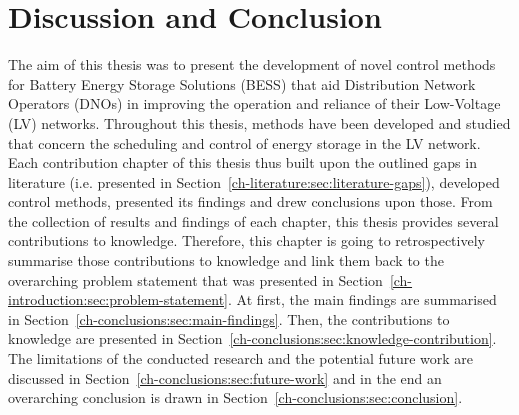 \chapter{Discussion and Conclusion}
\label{ch-conclusions}

The aim of this thesis was to present the development of novel control methods for Battery Energy Storage Solutions (BESS) that aid Distribution Network Operators (DNOs) in improving the operation and reliance of their Low-Voltage (LV) networks.
Throughout this thesis, methods have been developed and studied that concern the scheduling and control of energy storage in the LV network.
Each contribution chapter of this thesis thus built upon the outlined gaps in literature (i.e. presented in Section~\ref{ch-literature:sec:literature-gaps}), developed control methods, presented its findings and drew conclusions upon those.
From the collection of results and findings of each chapter, this thesis provides several contributions to knowledge.
Therefore, this chapter is going to retrospectively summarise those contributions to knowledge and link them back to the overarching problem statement that was presented in Section~\ref{ch-introduction:sec:problem-statement}.
At first, the main findings are summarised in Section~\ref{ch-conclusions:sec:main-findings}.
Then, the contributions to knowledge are presented in Section~\ref{ch-conclusions:sec:knowledge-contribution}.
The limitations of the conducted research and the potential future work are discussed in Section~\ref{ch-conclusions:sec:future-work} and in the end an overarching conclusion is drawn in Section~\ref{ch-conclusions:sec:conclusion}.











